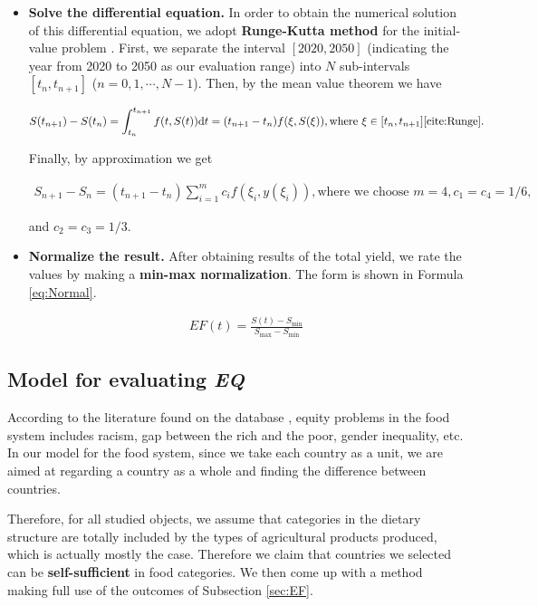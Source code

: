 \documentclass[12pt]{article}
\begin{document}
\begin{itemize}
    \item \textbf{Solve the differential equation.} In order to obtain the numerical solution of this differential equation, we adopt \textbf{Runge-Kutta method} for the initial-value problem \cite{cite:Runge}. First, we separate the interval $[2020, 2050]$ (indicating the year from 2020 to 2050 as our evaluation range) into $N$ sub-intervals $[t_n, t_{n+1}]$ ($n = 0, 1, \cdots, N-1$). Then, by the mean value theorem we have 
    
    \begin{align}
        S(t_{n+1}) - S(t_n) = \int^{t_{n+1}}_{t_n} f(t,S(t)) \mathrm{d}t = (t_{n+1}-t_{n}) f(\xi, S(\xi)), \text{where }\xi\in [t_n, t_{n+1}] \text{\cite{cite:Runge}}.
    \end{align}
    
    Finally, by approximation we get 
    
    \begin{align}
        S_{n+1} -S_n = (t_{n+1}-t_n) \sum^m_{i = 1} c_i f(\xi_i, y(\xi_i)), \text{where we choose }m = 4, c_1 = c_4 =1/6, 
    \end{align}
    
    and $c_2 = c_3 = 1/3$.
    
    \item \textbf{Normalize the result.} After obtaining results of the total yield, we rate the values by making a \textbf{min-max normalization}. The form is shown in Formula \eqref{eq:Normal}.
    
    \begin{align}
        \label{eq:Normal} EF(t) = \frac{S(t)-S_{\min}}{S_{\max}-S_{\min}}
    \end{align}
\end{itemize}

\subsection{Model for evaluating \textit{EQ}}

According to the literature found on the database \cite{cite:Equity_def, cite:Equity_def2}, equity problems in the food system includes racism, gap between the rich and the poor, gender inequality, etc. In our model for the food system, since we take each country as a unit, we are aimed at regarding a country as a whole and finding the difference between countries. 

Therefore, for all studied objects, we assume that categories in the dietary structure are totally included by the types of agricultural products produced, which is actually mostly the case. Therefore we claim that countries we selected can be \textbf{self-sufficient} in food categories. We then come up with a method making full use of the outcomes of Subsection \ref{sec:EF}. 
\end{document}
